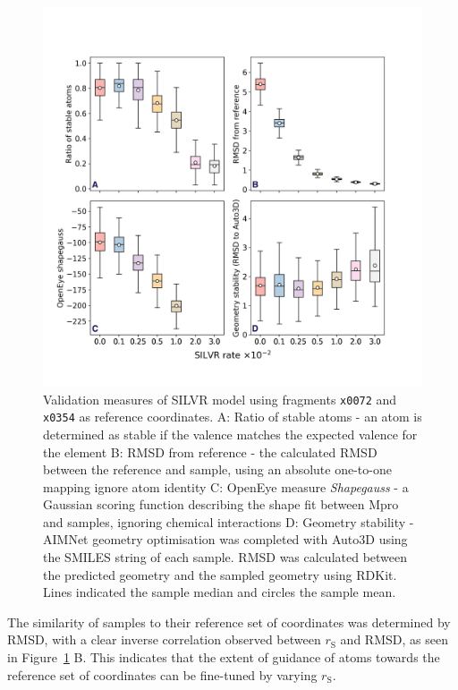 \documentclass[journal=jacsat,manuscript=article]{achemso}
\begin{document}
\begin{figure}[h!]
    \centering
    \includegraphics[width=\textwidth]{paper/Figures/Fig3/fig_3_metrics.png}
    \caption{Validation measures of SILVR model using fragments \texttt{x0072} and \texttt{x0354} as reference coordinates. A: Ratio of stable atoms - an atom is determined as stable if the valence matches the expected valence for the element B: RMSD from reference - the calculated RMSD between the reference and sample, using an absolute one-to-one mapping ignore atom identity C: OpenEye measure \textit{Shapegauss} - a Gaussian scoring function describing the shape fit between Mpro and samples, ignoring chemical interactions D: Geometry stability - AIMNet geometry optimisation was completed with Auto3D using the SMILES string of each sample. RMSD was calculated between the predicted geometry and the sampled geometry using RDKit. Lines indicated the sample median and circles the sample mean.}
    \label{fig:measures}
\end{figure}
The similarity of samples to their reference set of coordinates was determined by RMSD, with a clear inverse correlation observed between $r_{\mathrm{S}}$ and RMSD, as seen in Figure~\ref{fig:measures} B. This indicates that the extent of guidance of atoms towards the reference set of coordinates can be fine-tuned by varying $r_{\mathrm{S}}$. 
\end{document}
